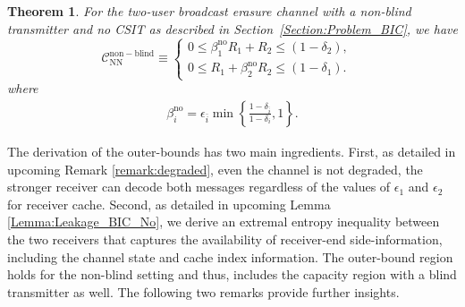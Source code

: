 \documentclass[journal,12pt,draftcls,onecolumn]{IEEEtran}
\newtheorem{theorem}{Theorem}
\begin{document}
\begin{theorem}
\label{THM:Capacity_Out_BIC_No}
For the two-user broadcast erasure channel with a non-blind transmitter and no CSIT as described in Section~\ref{Section:Problem_BIC}, we have
\begin{equation}
\label{Eq:Capacity_Out_BIC_No}
\mathcal{C}^\mathrm{non-blind}_\mathrm{NN} \equiv
\left\{ \begin{array}{ll}
0 \leq \beta^{\mathrm{no}}_1 R_1 + R_2 \leq \left( 1 - \delta_2 \right), & \\
0 \leq  R_1 + \beta^{\mathrm{no}}_2 R_2 \leq \left( 1 - \delta_1 \right). &
\end{array} \right.
\end{equation}
where
\begin{align}
\label{Eq:Beta_No}
\beta^{\mathrm{no}}_i = \epsilon_{\bar{i}} \min \left\{ \frac{1-\delta_{\bar{i}}}{1-\delta_i}, 1 \right\}.
\end{align}
\end{theorem}

The derivation of the outer-bounds has two main ingredients. First, as detailed in upcoming Remark \ref{remark:degraded}, even
the channel is not degraded, the stronger receiver can decode both messages regardless of the values of $\epsilon_1$ and $\epsilon_2$ for receiver cache. Second, as detailed in upcoming Lemma \ref{Lemma:Leakage_BIC_No}, we derive an extremal entropy inequality between the two receivers that captures the availability of receiver-end side-information, including the channel state and cache index information. The outer-bound region holds for the non-blind setting and thus, includes the capacity region with a blind transmitter as well. The following two remarks provide further insights.
\end{document}
